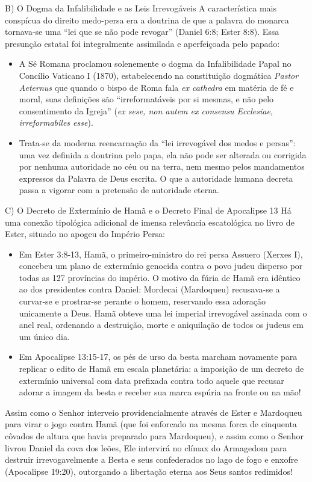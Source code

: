 B) O Dogma da Infalibilidade e as Leis Irrevogáveis
A característica mais conspícua do direito medo-persa era a doutrina de que a palavra do monarca tornava-se uma ``lei que se não pode revogar'' (Daniel 6:8; Ester 8:8). Essa presunção estatal foi integralmente assimilada e aperfeiçoada pelo papado:
\begin{itemize}
  \item A Sé Romana proclamou solenemente o dogma da Infalibilidade Papal no Concílio Vaticano I (1870), estabelecendo na constituição dogmática \textit{Pastor Aeternus} que quando o bispo de Roma fala \textit{ex cathedra} em matéria de fé e moral, suas definições são ``irreformatáveis por si mesmas, e não pelo consentimento da Igreja'' (\textit{ex sese, non autem ex consensu Ecclesiae, irreformabiles esse}).
  \item Trata-se da moderna reencarnação da ``lei irrevogável dos medos e persas'': uma vez definida a doutrina pelo papa, ela não pode ser alterada ou corrigida por nenhuma autoridade no céu ou na terra, nem mesmo pelos mandamentos expressos da Palavra de Deus escrita. O que a autoridade humana decreta passa a vigorar com a pretensão de autoridade eterna.
\end{itemize}


C) O Decreto de Extermínio de Hamã e o Decreto Final de Apocalipse 13
Há uma conexão tipológica adicional de imensa relevância escatológica no livro de Ester, situado no apogeu do Império Persa:
\begin{itemize}
  \item Em Ester 3:8-13, Hamã, o primeiro-ministro do rei persa Assuero (Xerxes I), concebeu um plano de extermínio genocida contra o povo judeu disperso por todas as 127 províncias do império. O motivo da fúria de Hamã era idêntico ao dos presidentes contra Daniel: Mordecai (Mardoqueu) recusava-se a curvar-se e prostrar-se perante o homem, reservando essa adoração unicamente a Deus. Hamã obteve uma lei imperial irrevogável assinada com o anel real, ordenando a destruição, morte e aniquilação de todos os judeus em um único dia.
  \item Em Apocalipse 13:15-17, os pés de urso da besta marcham novamente para replicar o edito de Hamã em escala planetária: a imposição de um decreto de extermínio universal com data prefixada contra todo aquele que recusar adorar a imagem da besta e receber sua marca espúria na fronte ou na mão!
\end{itemize}


Assim como o Senhor interveio providencialmente através de Ester e Mardoqueu para virar o jogo contra Hamã (que foi enforcado na mesma forca de cinquenta côvados de altura que havia preparado para Mardoqueu), e assim como o Senhor livrou Daniel da cova dos leões, Ele intervirá no clímax do Armagedom para destruir irrevogavelmente a Besta e seus confederados no lago de fogo e enxofre (Apocalipse 19:20), outorgando a libertação eterna aos Seus santos redimidos!



